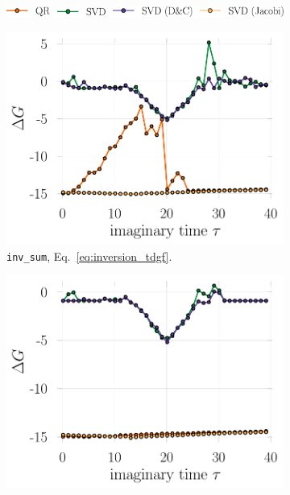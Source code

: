\documentclass[submission, Phys]{SciPost}
\begin{document}
\begin{figure}
	\centering
	\begin{subfigure}{0.98\textwidth}
		\centering
		\includegraphics[width=.65\textwidth]{figures/legend.pdf}
		\vspace{5pt}
	\end{subfigure}
	\begin{subfigure}{0.48\textwidth}
		\includegraphics[width=\textwidth]{figures/accuracy_tdgf_U0.pdf}
		\caption{\texttt{inv\_sum}, Eq.~\eqref{eq:inversion_tdgf}. \label{fig:tdgf_accuracy_regularinv}}
	\end{subfigure}%
	\hspace{10pt}
	\begin{subfigure}{0.48\textwidth}
		\includegraphics[width=\textwidth]{figures/accuracy_tdgf_loh_U0.pdf}

\end{subfigure}
\end{figure}
\end{document}
